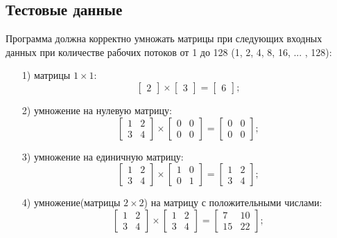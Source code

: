 \documentclass[a4paper,12pt]{article}
\begin{document}
    
%    
    \subsection{Тестовые данные}
    \label{fig:test_data}

    Программа должна корректно умножать матрицы при следующих входных данных при количестве рабочих потоков от 1 до 128 (1, 2, 4, 8, 16, ... , 128):
\\
\begin{enumerate}
	\item[1)] матрицы $1 \times 1$:
	\[ \begin{bmatrix}
2
\end{bmatrix} \times 
\begin{bmatrix}
3
\end{bmatrix} =
\begin{bmatrix}
6
\end{bmatrix}; \]

	\item[2)] умножение на нулевую матрицу:
	\[ \begin{bmatrix}
1 & 2 \\
3 & 4
\end{bmatrix} \times 
\begin{bmatrix}
0 & 0 \\
0 & 0
\end{bmatrix} =
\begin{bmatrix}
0 & 0 \\
0 & 0
\end{bmatrix}; \]

	\item[3)] умножение на единичную матрицу:
\[ \begin{bmatrix}
1 & 2 \\
3 & 4
\end{bmatrix} \times 
\begin{bmatrix}
1 & 0 \\
0 & 1
\end{bmatrix} =
\begin{bmatrix}
1 & 2 \\
3 & 4
\end{bmatrix}; \]

		\item[4)] умножение(матрицы $2 \times 2$) на матрицу с положительными числами:
\[ \begin{bmatrix}
1 & 2 \\
3 & 4
\end{bmatrix} \times 
\begin{bmatrix}
1 & 2 \\
3 & 4
\end{bmatrix} =
\begin{bmatrix}
7 & 10 \\
15 & 22
\end{bmatrix}; \]


\end{enumerate}
\end{document}

